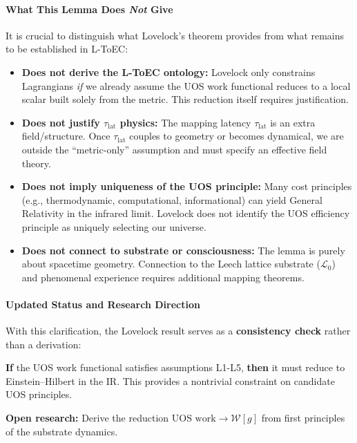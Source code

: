\documentclass[11pt,titlepage]{article}
\begin{document}
\paragraph{What This Lemma Does \emph{Not} Give}
It is crucial to distinguish what Lovelock's theorem provides from what remains to be established in L-ToEC:

\begin{itemize}
\item \textbf{Does not derive the L-ToEC ontology:} Lovelock only constrains Lagrangians \emph{if} we already assume the UOS work functional reduces to a local scalar built solely from the metric. This reduction itself requires justification.

\item \textbf{Does not justify $\tau_{\mathrm{lat}}$ physics:} The mapping latency $\tau_{\mathrm{lat}}$ is an extra field/structure. Once $\tau_{\mathrm{lat}}$ couples to geometry or becomes dynamical, we are outside the ``metric-only'' assumption and must specify an effective field theory.

\item \textbf{Does not imply uniqueness of the UOS principle:} Many cost principles (e.g., thermodynamic, computational, informational) can yield General Relativity in the infrared limit. Lovelock does not identify the UOS efficiency principle as uniquely selecting our universe.

\item \textbf{Does not connect to substrate or consciousness:} The lemma is purely about spacetime geometry. Connection to the Leech lattice substrate ($\mathcal{L}_0$) and phenomenal experience requires additional mapping theorems.
\end{itemize}

\paragraph{Updated Status and Research Direction}
With this clarification, the Lovelock result serves as a \textbf{consistency check} rather than a derivation:

\begin{tcolorbox}[colback=blue!5!white,colframe=blue!75!black,title=Consistency Check Passed]
\textbf{If} the UOS work functional satisfies assumptions L1-L5, \textbf{then} it must reduce to Einstein--Hilbert in the IR. This provides a nontrivial constraint on candidate UOS principles.

\textbf{Open research:} Derive the reduction $\text{UOS work} \to \mathcal{W}[g]$ from first principles of the substrate dynamics.
\end{tcolorbox}
\end{document}
